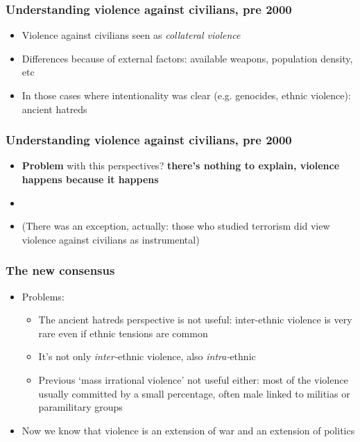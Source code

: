 \documentclass[utf8, xcolor=dvipsnames, handout]{beamer}
\begin{document}
\begin{frame}
\frametitle{Understanding violence against civilians, pre 2000}
\centering

\begin{itemize}
  \item<1-> Violence against civilians seen as \textit{collateral violence}
  \item<2-> Differences because of external factors: available weapons, population density, etc
  \item<3-> In those cases where intentionality was clear (e.g. genocides, ethnic violence): ancient hatreds
\end{itemize}


\end{frame}

\begin{frame}
\frametitle{Understanding violence against civilians, pre 2000}
\centering

\begin{itemize}
  \item<1-> \textbf{Problem} with this perspectives? \textbf{there's nothing to explain, violence happens because it happens}
  \item[]
  \item<2-> (There was an exception, actually: those who studied terrorism did view violence against civilians as instrumental)
\end{itemize}


\end{frame}

\begin{frame}
\frametitle{The new consensus}
\centering

\begin{itemize}[<+->]
  \item Problems:
  \begin{itemize}
    \item The ancient hatreds perspective is not useful: inter-ethnic violence is very rare even if ethnic tensions are common
    \item It's not only \textit{inter-}ethnic violence, also \textit{intra-}ethnic
    \item Previous `mass irrational violence' not useful either: most of the violence usually committed by a small percentage, often male linked to militias or paramilitary groups
  \end{itemize}
  \item Now we know that violence is an extension of war and an extension of politics
\end{itemize}



\end{frame}
\end{document}
